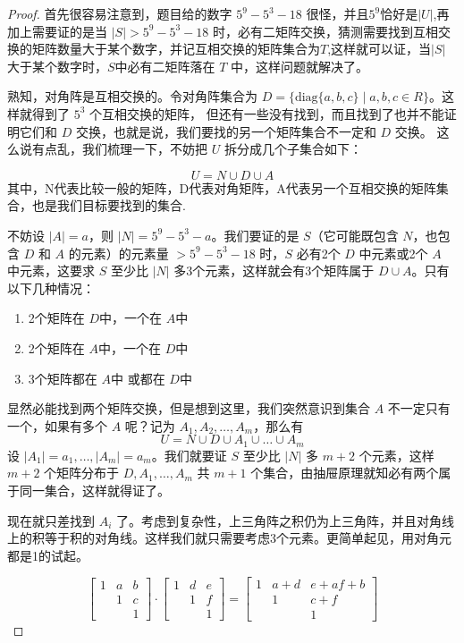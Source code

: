 \documentclass[12pt]{ctexart}  %
\begin{document}
\vspace{0.5em}
\begin{proof}首先很容易注意到，题目给的数字 \(5^9-5^3-18\) 很怪，并且$5^9$恰好是$|U|$,再加上需要证的是当 \(|S|>5^9-5^3-18\) 时，必有二矩阵交换，猜测需要找到互相交换的矩阵数量大于某个数字，并记互相交换的矩阵集合为$T$,这样就可以证，当$|S|$大于某个数字时，$S$中必有二矩阵落在 \(T\) 中，这样问题就解决了。

\vspace{0.5em}
熟知，对角阵是互相交换的。令对角阵集合为 \(D=\{\text{diag}\{a,b,c\}\mid a,b,c\in R\}\)。这样就得到了 \(5^3\) 个互相交换的矩阵，
但还有一些没有找到，而且找到了也并不能证明它们和 \(D\) 交换，也就是说，我们要找的另一个矩阵集合不一定和 \(D\) 交换。
这么说有点乱，我们梳理一下，不妨把 \(U\) 拆分成几个子集合如下：

\[
U = N \cup D \cup A
\]
其中，N代表比较一般的矩阵，D代表对角矩阵，A代表另一个互相交换的矩阵集合，也是我们目标要找到的集合.

\vspace{0.5em}
不妨设 \(|A|=a\)，则 \(|N|=5^9-5^3-a\)。我们要证的是 \(S\)（它可能既包含 \(N\)，也包含 \(D\) 和 \(A\) 的元素）的元素量 \(>5^9-5^3-18\) 时，\(S\) 必有2个 \(D\) 中元素或2个 \(A\) 中元素，这要求 \(S\) 至少比 \(|N|\) 多3个元素，这样就会有3个矩阵属于 \(D\cup A\)。只有以下几种情况：
\begin{enumerate}
    \item 2个矩阵在 \(D\)中，一个在 \(A\)中
    \item 2个矩阵在 \(A\)中，一个在 \(D\)中
    \item 3个矩阵都在 \(A\)中 或都在 \(D\)中
\end{enumerate}
显然必能找到两个矩阵交换，但是想到这里，我们突然意识到集合 \(A\) 不一定只有一个，如果有多个 \(A\) 呢？记为 \(A_1,A_2,\dots,A_m\)，那么有
\[
U = N \cup D \cup A_1 \cup \dots \cup A_m
\]
设 \(|A_1|=a_1,\dots,|A_m|=a_m\)。我们就要证 \(S\) 至少比 \(|N|\) 多 \(m+2\) 个元素，这样 \(m+2\) 个矩阵分布于 \(D,A_1,\dots,A_m\) 共 \(m+1\) 个集合，由抽屉原理就知必有两个属于同一集合，这样就得证了。

\vspace{0.5em}
现在就只差找到 \(A_i\) 了。考虑到复杂性，上三角阵之积仍为上三角阵，并且对角线上的积等于积的对角线。这样我们就只需要考虑3个元素。更简单起见，用对角元都是1的试起。

\[
\begin{bmatrix}
1 & a & b \\
& 1 & c \\
& & 1
\end{bmatrix}
\cdot
\begin{bmatrix}
1 & d & e \\
& 1 & f \\
& & 1
\end{bmatrix}
=
\begin{bmatrix}
1 & a+d & e+af+b \\
& 1 & c+f \\
& & 1
\end{bmatrix}
\]


\end{proof}
\end{document}
